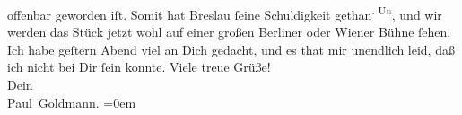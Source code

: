 \begin{ledgroupsized}[t]{13cm}
                   offenbar geworden iſt. Somit hat Breslau ſeine Schuldigkeit gethan\substVorne{}\textsuperscript{. U\textcolor{gray}{n}}\substDazwischen{},\substHinten{} und wir werden das Stück jetzt wohl \label{K_L02942-2v}\label{K_L02942-2h} auf einer großen Berliner oder Wiener Bühne ſehen. Ich habe geſtern{ }Abend viel an Dich {\pb}gedacht, und es
               that mir unendlich leid, daß ich nicht bei Dir ſein konnte.\pend
           \pstart
           Viele treue Grüße! {\\[\baselineskip]}Dein {\\[\baselineskip]}\spacefill\mbox{Paul Goldmann.}\pend
           \leftskip=0em{}
         
         \endnumbering{}\end{ledgroupsized}  \newcommand{\dateiname}{L02942}\newcommand{\titel}{Paul Goldmann an Arthur Schnitzler, 2. 12. [1900]}\newcommand{\editorInnen}{Martin Anton Müller und Laura Untner}
      